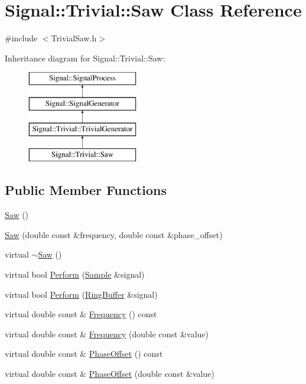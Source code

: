 \hypertarget{classSignal_1_1Trivial_1_1Saw}{\section{Signal\+:\+:Trivial\+:\+:Saw Class Reference}
\label{classSignal_1_1Trivial_1_1Saw}
}


{\ttfamily \#include $<$Trivial\+Saw.\+h$>$}

Inheritance diagram for Signal\+:\+:Trivial\+:\+:Saw\+:\begin{figure}[H]
\begin{center}
\leavevmode
\includegraphics[height=4.000000cm]{classSignal_1_1Trivial_1_1Saw}
\end{center}
\end{figure}
\subsection*{Public Member Functions}
\begin{DoxyCompactItemize}
\item 
\hyperlink{classSignal_1_1Trivial_1_1Saw_a5bcda77542a15e452621add24d863675}{Saw} ()
\item 
\hyperlink{classSignal_1_1Trivial_1_1Saw_af8047f2e7f6b61d11eeed6e1661d446b}{Saw} (double const \&frequency, double const \&phase\+\_\+offset)
\item 
virtual \hyperlink{classSignal_1_1Trivial_1_1Saw_af3e6c26232d88db383cf7ba3c9c3d916}{$\sim$\+Saw} ()
\item 
virtual bool \hyperlink{classSignal_1_1Trivial_1_1Saw_afb45d71dc1d77e08fe6c460a4da06226}{Perform} (\hyperlink{classSignal_1_1Sample}{Sample} \&signal)
\item 
virtual bool \hyperlink{classSignal_1_1Trivial_1_1Saw_a84a3e8648f356821a52dd4d2cc1059b6}{Perform} (\hyperlink{classSignal_1_1RingBuffer}{Ring\+Buffer} \&signal)
\item 
virtual double const \& \hyperlink{classSignal_1_1SignalGenerator_a96af42ee68f94e9b04d034fd68b73ecd}{Frequency} () const 
\item 
virtual double const \& \hyperlink{classSignal_1_1SignalGenerator_af83b532bf3ddc3637c2fd7a1dfd095cb}{Frequency} (double const \&value)
\item 
virtual double const \& \hyperlink{classSignal_1_1SignalGenerator_ac2538ec946f001e394d2416fda698d1c}{Phase\+Offset} () const 
\item 
virtual double const \& \hyperlink{classSignal_1_1SignalGenerator_ac6a103ff72beaa338f6d18c812522d78}{Phase\+Offset} (double const \&value)
\end{DoxyCompactItemize}
